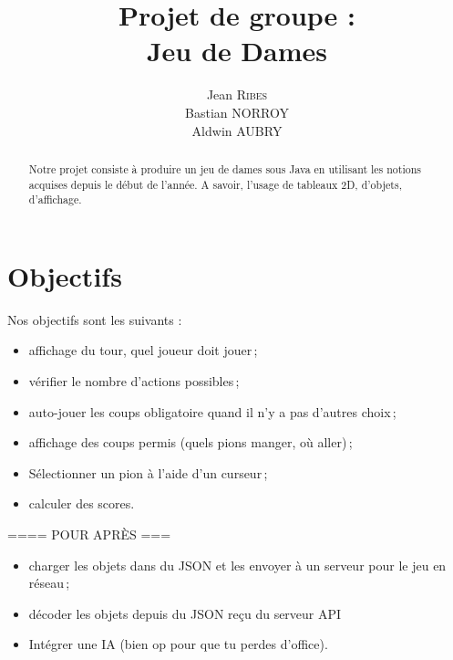 \documentclass{article}
\title{Projet de groupe :\\ Jeu de Dames} %
\author{Jean \textsc{Ribes}\\Bastian \textsc{NORROY}\\Aldwin \textsc{AUBRY}} %
\date{} %
\begin{document}
\maketitle %
\vfill

\begin{abstract}
Notre projet consiste à produire un jeu de dames sous Java en utilisant les notions acquises depuis le début de l'année. A savoir, l'usage de tableaux 2D, d'objets, d'affichage.
\end{abstract}
\vfill
\section{Objectifs}

Nos objectifs sont les suivants :
\begin{itemize}
\item affichage du tour, quel joueur doit jouer\,;
\item vérifier le nombre d'actions possibles\,;
\item auto-jouer les coups obligatoire quand il n'y a pas d'autres choix\,;
\item affichage des coups permis (quels pions manger, où aller)\,;
\item Sélectionner un pion à l'aide d'un curseur\,;
\item calculer des scores.
\end{itemize}
\begin{center}==== POUR APRÈS ===\end{center}
\begin{itemize}
\item charger les objets dans du JSON et les envoyer à un serveur pour le jeu en réseau\,;
\item décoder les objets depuis du JSON reçu du serveur API\,
\item Intégrer une IA (bien op pour que tu perdes d'office).
\end{itemize}
\newpage



\end{document}
